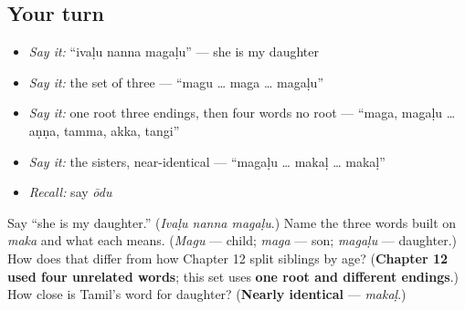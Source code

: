 \subsection*{Your turn}
\begin{itemize}
\raggedright
  \item \emph{Say it:} \textquotedblleft{}ivaḷu nanna magaḷu\textquotedblright{} — she is my daughter
  \item \emph{Say it:} the set of three — \textquotedblleft{}magu … maga … magaḷu\textquotedblright{}
  \item \emph{Say it:} one root three endings, then four words no root — \textquotedblleft{}maga, magaḷu … aṇṇa, tamma, akka, tangi\textquotedblright{}
  \item \emph{Say it:} the sisters, near-identical — \textquotedblleft{}magaḷu … makaḷ … makaḷ\textquotedblright{}
  \item \emph{Recall:} say \emph{ōdu}
\end{itemize}

\begin{tcolorbox}[breakable,colback=teal!4,colframe=teal!35!black,title={Before you move on}]
Say \textquotedblleft{}she is my daughter.\textquotedblright{} (\emph{Ivaḷu nanna magaḷu}.) Name the three words built on \emph{maka} and what each means. (\emph{Magu} — child; \emph{maga} — son; \emph{magaḷu} — daughter.) How does that differ from how Chapter 12 split siblings by age? (\textbf{Chapter 12 used four unrelated words}; this set uses \textbf{one root and different endings}.) How close is Tamil's word for daughter? (\textbf{Nearly identical} — \emph{makaḷ}.)
\end{tcolorbox}
